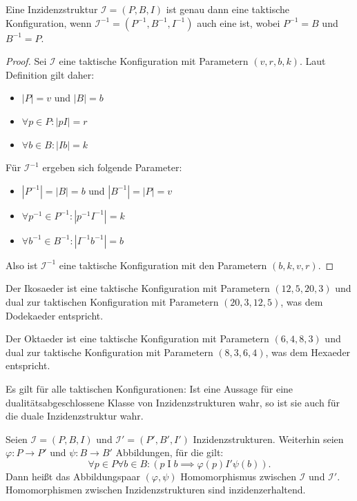 \documentclass{article}
\begin{document}
\begin{theorem}
  Eine Inzidenzstruktur $\mathcal{I} = (P, B, I)$ ist genau dann eine taktische Konfiguration,
  wenn $\mathcal{I}^{-1} = (P^{-1}, B^{-1}, I^{-1})$ auch eine ist, wobei $P^{-1} = B$ und $B^{-1} = P$.
\end{theorem}
\begin{proof}
  Sei $\mathcal{I}$ eine taktische Konfiguration mit Parametern $(v, r, b, k)$. 
  Laut Definition gilt daher:
  \begin{itemize}
    \item $|P| = v$ und $|B| = b$
    \item $\forall p \in P \colon |pI| = r$
    \item $\forall b \in B \colon |Ib| = k$
  \end{itemize}
  Für $\mathcal{I}^{-1}$ ergeben sich folgende Parameter:
  \begin{itemize}
    \item $|P^{-1}| = |B| = b$ und $|B^{-1}| = |P| = v$
    \item $\forall p^{-1} \in P^{-1} \colon |p^{-1}I^{-1}| = k$
    \item $\forall b^{-1} \in B^{-1} \colon |I^{-1}b^{-1}| = b$
  \end{itemize}
  Also ist $\mathcal{I}^{-1}$ eine taktische Konfiguration mit den Parametern $(b, k, v, r)$.
\end{proof}

\begin{example}    
  Der Ikosaeder ist eine taktische Konfiguration mit Parametern $(12, 5, 20, 3)$
  und dual zur taktischen Konfiguration mit Parametern $(20, 3, 12, 5)$,
  was dem Dodekaeder entspricht.

  Der Oktaeder ist eine taktische Konfiguration mit Parametern $(6, 4, 8, 3)$ 
  und dual zur taktische Konfiguration mit Parametern $(8, 3, 6, 4)$,
  was dem Hexaeder entspricht.
\end{example}

\begin{theorem}[Dualitätsprinzip]
  Es gilt für alle taktischen Konfigurationen:
  Ist eine Aussage für eine dualitätsabgeschlossene Klasse von Inzidenzstrukturen wahr,
  so ist sie auch für die duale Inzidenzstruktur wahr.
\end{theorem}

\begin{definition}
  Seien $\mathcal{I} = (P, B, I)$ und $\mathcal{I}' = (P', B', I')$ Inzidenzstrukturen.
  Weiterhin seien ${\varphi \colon P \to P'}$ und ${\psi \colon B \to B'}$ Abbildungen,
  für die gilt:
  \begin{equation*}
    \forall p \in P \forall b \in B \colon (p \mathrel{I} b \implies \varphi(p) \mathrel{I'} \psi(b)).
  \end{equation*}
  Dann heißt das Abbildungspaar $(\varphi, \psi)$ Homomorphismus zwischen $\mathcal{I}$ und $\mathcal{I}'$.
  Homomorphismen zwischen Inzidenzstrukturen sind inzidenzerhaltend.
\end{definition}
\end{document}
